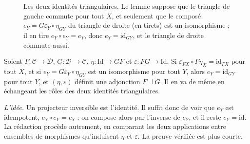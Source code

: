 \begin{figure}[htbp]
\centering
{}
\qquad\qquad
{}
\caption{Les deux identités triangulaires. Le lemme suppose que le triangle de gauche commute pour tout $X$, et seulement que le composé $e_Y = G\varepsilon_Y \circ \eta_{GY}$ du triangle de droite (en tirets) est un isomorphisme ; il en tire $e_Y \circ e_Y = e_Y$, donc $e_Y = \mathrm{id}_{GY}$, et le triangle de droite commute aussi.}
\label{fig:bourbaki-438}
\end{figure}

\begin{encadre}
\begin{enonce}
Soient $F : \mathcal C \to \mathcal D$, $G : \mathcal D \to \mathcal C$, $\eta : \mathrm{Id} \to GF$ et $\varepsilon : FG \to \mathrm{Id}$. Si $\varepsilon_{FX} \circ F\eta_X = \mathrm{id}_{FX}$ pour tout $X$, et si $e_Y = G\varepsilon_Y \circ \eta_{GY}$ est un isomorphisme pour tout $Y$, alors $e_Y = \mathrm{id}_{GY}$ pour tout $Y$, et $(\eta, \varepsilon)$ définit une adjonction $F \dashv G$. Il en va de même en échangeant les rôles des deux identités triangulaires.
\end{enonce}
\end{encadre}

\emph{L'idée.} Un projecteur inversible est l'identité. Il suffit donc de voir que $e_Y$ est idempotent, $e_Y \circ e_Y = e_Y$ : on compose alors par l'inverse de $e_Y$, et il reste $e_Y = \mathrm{id}$. La rédaction procède autrement, en comparant les deux applications entre ensembles de morphismes qu'induisent $\eta$ et $\varepsilon$. La preuve vérifiée est plus courte.

